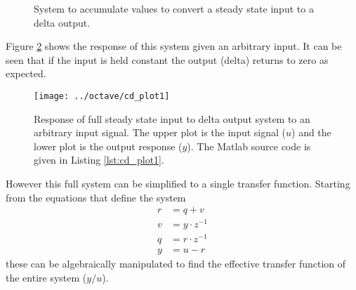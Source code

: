 \documentclass{article}
\begin{document}
\begin{figure}[hpb!]
\begin{center}


\end{center}

\caption{System to accumulate values to convert a steady state
input to a delta output.}
\label{fig:cd1}
\end{figure}


Figure \ref{fig:cd_plot1} shows the response of this system given
an arbitrary input.
It can be seen that if the input is held constant the output (delta)
returns to zero as expected.

\begin{figure}[htbp!]
\texttt{[image: ../octave/cd\_plot1]}
\caption{Response of full steady state input to delta output system
to an arbitrary input signal.
The upper plot is the input signal ($u$) and the lower plot is
the output response ($y$).
The Matlab source code is given in Listing \ref{lst:cd_plot1}.
}
\label{fig:cd_plot1}
\end{figure}

\begin{samepage}
However this full system can be simplified to a single transfer function.
Starting from the equations that define the system
\begin{align}
	r &= q + v \label{eq:cd1a} \\
	v &= y \cdot z^{-1} \label{eq:cd1b} \\
	q &= r \cdot z^{-1} \label{eq:cd1c} \\
	y &= u - r \label{eq:cd1d}
\end{align}
these can be algebraically manipulated to find the effective transfer
function of the entire system ($y/u$).
\end{samepage}
\end{document}
